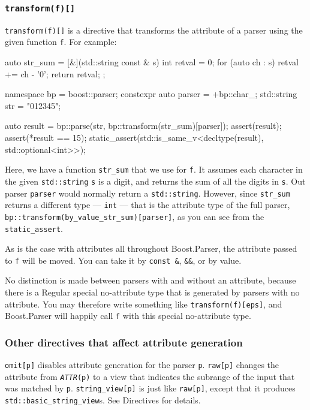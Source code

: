 \subsubsection{\texorpdfstring{\texttt{transform(f){[}{]}}}{transform(f){[}{]}}}

\texttt{transform(f){[}{]}} is a directive that transforms the attribute of a parser using the given function \texttt{f}. For example:

\begin{code}
auto str_sum = [&](std::string const & s) {
    int retval = 0;
    for (auto ch : s) {
        retval += ch - '0';
    }
    return retval;
};

namespace bp = boost::parser;
constexpr auto parser = +bp::char_;
std::string str = "012345";

auto result = bp::parse(str, bp::transform(str_sum)[parser]);
assert(result);
assert(*result == 15);
static_assert(std::is_same_v<decltype(result), std::optional<int>>);
\end{code}

Here, we have a function \texttt{str\_sum} that we use for \texttt{f}. It assumes each character in the given \texttt{std::string} \texttt{s} is a digit, and returns the sum of all the digits in \texttt{s}. Out parser \texttt{parser} would normally return a \texttt{std::string}. However, since \texttt{str\_sum} returns a different type --- \texttt{int} --- that is the attribute type of the full parser, \texttt{bp::transform(by\_value\_str\_sum){[}parser{]}}, as you can see from the \texttt{static\_assert}.

As is the case with attributes all throughout Boost.Parser, the attribute passed to \texttt{f} will be moved. You can take it by \texttt{const \&}, \texttt{\&\&}, or by value.

No distinction is made between parsers with and without an attribute, because there is a Regular special no-attribute type that is generated by parsers with no attribute. You may therefore write something like \texttt{transform(f){[}eps{]}}, and Boost.Parser will happily call \texttt{f} with this special no-attribute type.

\subsubsection{Other directives that affect attribute generation}

\texttt{omit{[}p{]}} disables attribute generation for the parser \texttt{p}. \texttt{raw{[}p{]}} changes the attribute from \emph{\texttt{ATTR}}\texttt{(p)} to a view that indicates the subrange of the input that was matched by \texttt{p}. \texttt{string\_view{[}p{]}} is just like \texttt{raw{[}p{]}}, except that it produces \texttt{std::basic\_string\_view}s. See Directives for details.

